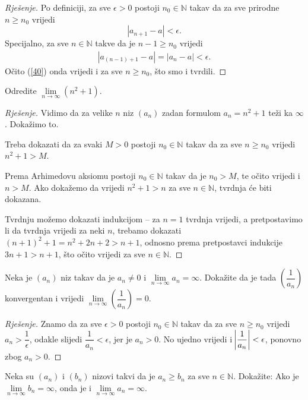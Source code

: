 \begin{proof}[Rješenje]
Po definiciji, za sve $\epsilon>0$ postoji $n_0\in \mathbb{N}$ takav da za sve prirodne $n\geq n_0$ vrijedi $$|a_{n+1}-a|<\epsilon.$$ Specijalno, za sve $n\in \mathbb{N}$ takve da je $n-1\geq n_0$ vrijedi 
\begin{gather}
\label{40}
|a_{(n-1)+1}-a|=|a_n-a|<\epsilon.
\end{gather}
Očito (\ref{40}) onda vrijedi i za sve $n\geq n_0$, što smo i tvrdili.
\end{proof}
\begin{exercise}
Odredite $\lim\limits_{n\to \infty} \left(n^2+1\right)$.
\end{exercise}
\begin{proof}[Rješenje]
Vidimo da za velike $n$ niz $(a_n)$ zadan formulom $a_n=n^2+1$ teži ka $\infty$. Dokažimo to. 

Treba dokazati da za svaki $M>0$ postoji $n_0\in \mathbb{N}$ takav da za sve $n\geq n_0$ vrijedi $n^2+1>M$. 

Prema Arhimedovu aksiomu postoji $n_0\in \mathbb{N}$ takav da je $n_0>M$, te očito vrijedi i $n>M$. Ako dokažemo da vrijedi $n^2+1>n$ za sve $n\in \mathbb{N}$, tvrdnja će biti dokazana. 

Tvrdnju možemo dokazati indukcijom -- za $n=1$ tvrdnja vrijedi, a pretpostavimo li da tvrdnja vrijedi za neki $n$, trebamo dokazati $(n+1)^2+1=n^2+2n+2>n+1$, odnosno prema pretpostavci indukcije $3n+1>n+1$, što očito vrijedi za sve $n\in \mathbb{N}$.
\end{proof}
\begin{exercise}
\label{6}
Neka je $(a_n)$ niz takav da je $a_n\neq 0$ i $\lim\limits_{n\to \infty}{a_n}=\infty$. Dokažite da je tada $\left(\dfrac{1}{a_n}\right)$ konvergentan i vrijedi $\lim\limits_{n\to \infty}\left(\dfrac{1}{a_n}\right)=0$.
\end{exercise}
\begin{proof}[Rješenje]
Znamo da za sve $\epsilon>0$ postoji $n_0\in \mathbb{N}$ takav da za sve $n\geq n_0$ vrijedi $a_n>\dfrac{1}{\epsilon}$, odakle slijedi $\dfrac{1}{a_n}<\epsilon$, jer je $a_n>0$. No ujedno vrijedi i $\abs{\dfrac{1}{a_n}}<\epsilon$, ponovno zbog $a_n>0$.
\end{proof}
\begin{exercise}
\label{liminftylemma}
Neka su $(a_n)$ i $(b_n)$ nizovi takvi da je $a_n\geq b_n$ za sve $n\in \mathbb{N}$. Dokažite: Ako je $\lim\limits_{n\to \infty}{b_n}=\infty$, onda je i $\lim\limits_{n\to \infty}{a_n}=\infty$.
\end{exercise}

